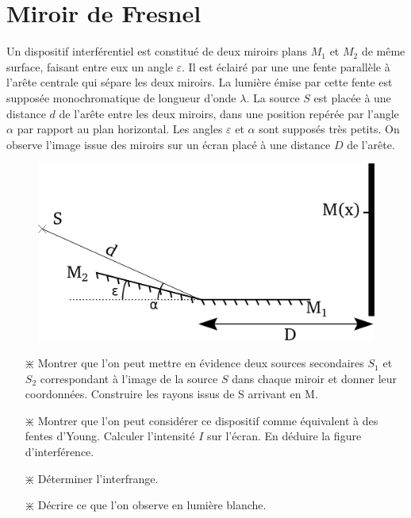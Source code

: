 \documentclass{report}
\begin{document}
\newpage

\section*{Miroir de Fresnel}

Un dispositif interférentiel est constitué de deux miroirs plans $M_1$ et $M_2$ de même surface, faisant entre eux un angle $\varepsilon$. Il est éclairé par une une fente parallèle à l'arête centrale qui sépare les deux miroirs. La lumière émise par cette fente est supposée monochromatique de longueur d'onde $\lambda$. La source $S$ est placée à une distance $d$ de l'arête entre les deux miroirs, dans une position repérée par l'angle $\alpha$ par rapport au plan horizontal. Les angles $\varepsilon$ et $\alpha$ sont supposés très petits. On observe l'image issue des miroirs sur un écran placé à une distance $D$ de l'arête.

\begin{figure}[h]
\centering
  \includegraphics[scale=0.25]{fresnel.pdf}
\end{figure}

\begin{itemize}

	\item[$\divideontimes$] Montrer que l'on peut mettre en évidence deux sources secondaires $S_1$ et $S_2$ correspondant à l'image de la source $S$ dans chaque miroir et donner leur coordonnées. Construire les rayons issus de S arrivant en M.
	
	\item[$\divideontimes$] Montrer que l'on peut considérer ce dispositif comme équivalent à des fentes d'Young. Calculer l'intensité $I$ sur l'écran. En déduire la figure d'interférence.
	
	\item[$\divideontimes$] Déterminer l'interfrange.
	
	\item[$\divideontimes$] Décrire ce que l'on observe en lumière blanche.

\end{itemize}
\end{document}
